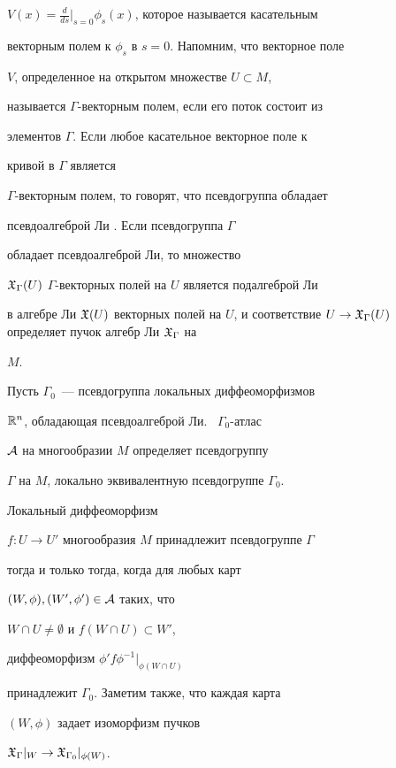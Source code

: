 $V(x) =


\frac{d}{ds}\big|_{s=0}\phi_s(x)$, которое называется касательным


векторным полем к $\phi_s$ в $s=0$. Напомним, что векторное поле


$V$, определенное на открытом множестве $U \subset M$,


называется $\Gamma$-векторным полем, если его поток  состоит из


элементов $\Gamma$. Если любое касательное векторное поле к


кривой в $\Gamma$ является


$\Gamma$-векторным полем, то говорят, что псевдогруппа обладает


псевдоалгеброй Ли \cite{Spen1}. Если псевдогруппа $\Gamma$


обладает псевдоалгеброй Ли, то множество


${\frak X}_\Gamma(U)$ $\Gamma$-векторных полей на $U$ является подалгеброй Ли


в алгебре Ли $\gX(U)$ векторных полей на $U$, и соответствие $U


\to \gX_\Gamma(U)$ определяет пучок алгебр Ли $\gX_\Gamma$ на


$M$.





Пусть $\Gamma_0$~--- псевдогруппа локальных диффеоморфизмов


${\Bbb R}^n$, обладающая псевдоалгеброй Ли. \ $\Gamma_0$-атлас


${\cal A}$ на многообразии $M$ определяет псевдогруппу


$\Gamma$ на $M$, локально эквивалентную псевдогруппе $\Gamma_0$.


Локальный диффеоморфизм


$f : U \to U'$ многообразия $M$ принадлежит псевдогруппе $\Gamma$


тогда и только тогда, когда для любых карт


$(W, \phi), (W',\phi') \in {\cal A}$ таких, что


$W \cap U \ne \emptyset$ и $f(W \cap U) \subset W'$,


диффеоморфизм $\phi' f \phi^{-1} \vert_{\phi(W \cap U)}$


принадлежит $\Gamma_0$. Заметим также, что каждая карта


$(W, \phi)$ задает изоморфизм пучков


${\frak X}_{\Gamma}|_W \to {\frak X}_{\Gamma_0}|_{\phi(W)}$.





